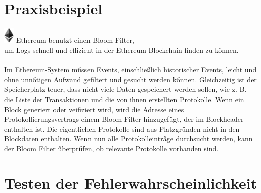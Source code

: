 \documentclass[11pt, a4paper]{article}
\begin{document}
\section{Praxisbeispiel}
\includegraphics[height=8mm]{image/Ethereum.png}
Ethereum benutzt einen Bloom Filter,\\ um Logs schnell und effizient in der Ethereum Blockchain finden zu k{\H o}nnen. \\
\\
Im Ethereum-System m{\H u}ssen Events, einschließlich historischer Events, leicht und ohne unn{\H o}tigen Aufwand gefiltert und gesucht werden k{\H o}nnen. Gleichzeitig ist der Speicherplatz teuer, dass nicht viele Daten gespeichert werden sollen, wie z. B. die Liste der Transaktionen und die von ihnen erstellten Protokolle.
Wenn ein Block generiert oder veifiziert wird, wird die Adresse eines Protokollierungsvertrags einem Bloom Filter hinzugef{\H u}gt, der im Blockheader enthalten ist. Die eigentlichen Protokolle sind aus Platzgr{\H u}nden nicht in den Blockdaten enthalten.
Wenn nun alle Protokolleintr{\H a}ge durchsucht werden, kann der Bloom Filter {\H u}berpr{\H u}fen, ob relevante Protokolle vorhanden sind.

\section{Testen der Fehlerwahrscheinlichkeit}
\end{document}
